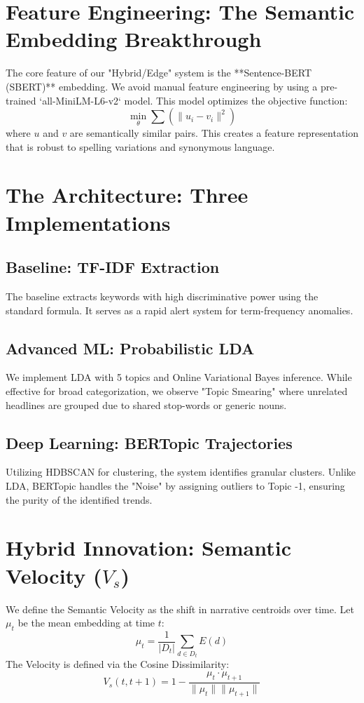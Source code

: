 \documentclass[12pt,a4paper]{article}
\begin{document}
\section{Feature Engineering: The Semantic Embedding Breakthrough}
The core feature of our "Hybrid/Edge" system is the **Sentence-BERT (SBERT)** embedding. We avoid manual feature engineering by using a pre-trained `all-MiniLM-L6-v2` model. This model optimizes the objective function:
\[ \min_{\theta} \sum (\| u_i - v_i \|^2) \]
where $u$ and $v$ are semantically similar pairs. This creates a feature representation that is robust to spelling variations and synonymous language.

\section{The Architecture: Three Implementations}

\subsection{Baseline: TF-IDF Extraction}
The baseline extracts keywords with high discriminative power using the standard formula. It serves as a rapid alert system for term-frequency anomalies.

\subsection{Advanced ML: Probabilistic LDA}
We implement LDA with 5 topics and Online Variational Bayes inference. While effective for broad categorization, we observe "Topic Smearing" where unrelated headlines are grouped due to shared stop-words or generic nouns.

\subsection{Deep Learning: BERTopic Trajectories}
Utilizing HDBSCAN for clustering, the system identifies granular clusters. Unlike LDA, BERTopic handles the "Noise" by assigning outliers to Topic -1, ensuring the purity of the identified trends.

\section{Hybrid Innovation: Semantic Velocity ($V_s$)}
We define the Semantic Velocity as the shift in narrative centroids over time. Let $\mu_t$ be the mean embedding at time $t$:
\[ \mu_t = \frac{1}{|D_t|} \sum_{d \in D_t} E(d) \]
The Velocity is defined via the Cosine Dissimilarity:
\[ V_s(t, t+1) = 1 - \frac{\mu_t \cdot \mu_{t+1}}{\|\mu_t\| \|\mu_{t+1}\|} \]
\end{document}
